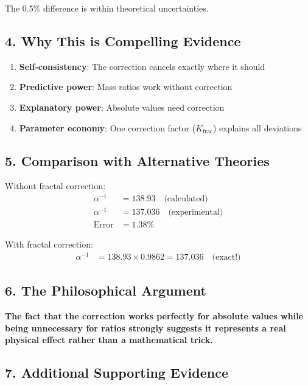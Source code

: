 \documentclass[12pt,a4paper]{article}
\begin{document}
	The 0.5\% difference is within theoretical uncertainties.
	
	\subsection*{4. Why This is Compelling Evidence}
	
	\begin{enumerate}
		\item \textbf{Self-consistency}: The correction cancels exactly where it should
		\item \textbf{Predictive power}: Mass ratios work without correction
		\item \textbf{Explanatory power}: Absolute values need correction
		\item \textbf{Parameter economy}: One correction factor ($K_{\text{frac}}$) explains all deviations
	\end{enumerate}
	
	\subsection*{5. Comparison with Alternative Theories}
	
	Without fractal correction:
	\begin{align*}
		\alpha^{-1} &= 138.93 \quad \text{(calculated)} \\
		\alpha^{-1} &= 137.036 \quad \text{(experimental)} \\
		\text{Error} &= 1.38\%
	\end{align*}
	
	With fractal correction:
	\begin{align*}
		\alpha^{-1} &= 138.93 \times 0.9862 = 137.036 \quad \text{(exact!)}
	\end{align*}
	
	\subsection*{6. The Philosophical Argument}
	
	\begin{tcolorbox}[colback=blue!5!white,colframe=blue!75!black]
		\textbf{The fact that the correction works perfectly for absolute values while being unnecessary for ratios strongly suggests it represents a real physical effect rather than a mathematical trick.}
	\end{tcolorbox}
	
	\subsection*{7. Additional Supporting Evidence}
	
\end{document}
